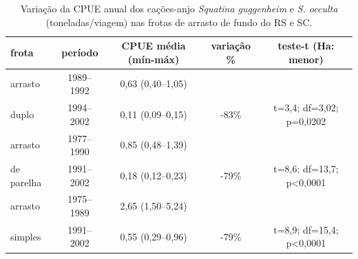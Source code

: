 \documentclass[a4paper,11pt,twoside,showtrims,onecolumn,openright,final]{memoir}
\begin{document}


\begin{table}
\caption[Variação da CPUE anual dos cações-anjo.]
        {Variação da CPUE anual dos cações-anjo \emph{Squatina guggenheim} e \emph{S. occulta}
	(toneladas/viagem) nas frotas de arrasto de fundo do RS e SC.}
\label{tab:cpue-anjo}
\begin{small}
\begin{tabular*}{\textwidth}{l@{\extracolsep{\fill}}cccc}
\toprule
frota		& período	& CPUE média (mín-máx)	& variação \%	& teste-t (Ha: menor)		\\
\midrule
arrasto		& 1989--1992	& 0,63 (0,40--1,05)      &               &				\\
duplo		& 1994--2002	& 0,11 (0,09--0,15)	& -83\%		& t=3,4; df=3,02; p=0,0202	\\
\midrule
arrasto		& 1977--1990	& 0,85 (0,48--1,39)      &               &				\\
de parelha	& 1991--2002	& 0,18 (0,12--0,23)	& -79\%		& t=8,6; df=13,7; p<0,0001	\\
\midrule
arrasto		& 1975--1989	& 2,65 (1,50--5,24)      &               &				\\
simples		& 1991--2002	& 0,55 (0,29--0,96)	& -79\%		& t=8,9; df=15,4; p<0,0001	\\
\bottomrule
\end{tabular*}
\end{small}
\end{table}

\end{document}

